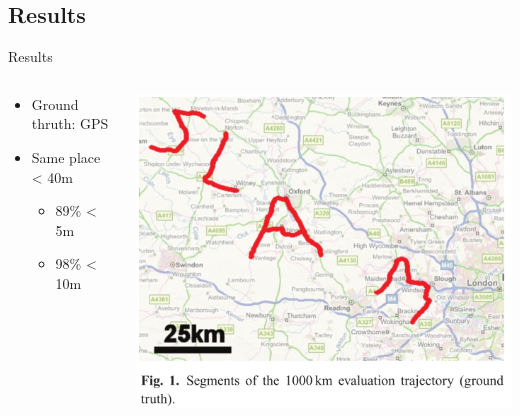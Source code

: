 \subsection{Results}
\begin{frame}{Results}
    \begin{columns}
        \begin{column}{0.4\textwidth}
            \begin{itemize}
                \item Ground thruth: GPS
                \item Same place < 40m
                    \begin{itemize}
                        \item 89\% < 5m
                        \item 98\% < 10m
                    \end{itemize}
            \end{itemize}
        \end{column}
        \begin{column}{0.6\textwidth}
            \includegraphics[width=1.0\textwidth]{./media/map_fabmap2.png}
        \end{column}
    \end{columns}
\end{frame}

